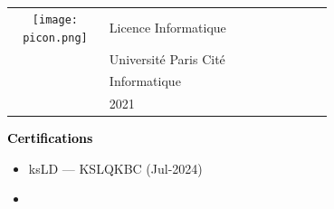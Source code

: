 \documentclass{article}
\begin{document}
\begin{paracol}{2}
~

~

 \begin{tabular}{@{}cp{0.7\linewidth}}
      \begin{minipage}{0.05\linewidth}
        \texttt{[image: picon.png]}
      \end{minipage} & \vspace{-12pt}
      {\color{sidetext} {Licence Informatique}} \\[-6pt]
      & {Université Paris Cité} \\
      & {Informatique} \\
      & {2021} 
    \end{tabular}

\vspace{0.5cm}

\textcolor{black}{\Large \textbf{Certifications}} \\

\begin{itemize}[leftmargin=12pt]
\item ksLD  — KSLQKBC (Jul-2024)
\item 
\end{itemize}


\end{paracol}
\end{document}
